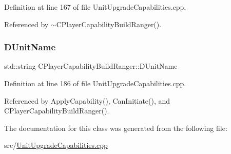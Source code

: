 Definition at line 167 of file Unit\+Upgrade\+Capabilities.\+cpp.



Referenced by $\sim$\+C\+Player\+Capability\+Build\+Ranger().

\hypertarget{classCPlayerCapabilityBuildRanger_a4e85674699365fe1e77bcb2a1996d7ba}{}\label{classCPlayerCapabilityBuildRanger_a4e85674699365fe1e77bcb2a1996d7ba} 
\subsubsection{\texorpdfstring{D\+Unit\+Name}{DUnitName}}
{\footnotesize\ttfamily std\+::string C\+Player\+Capability\+Build\+Ranger\+::\+D\+Unit\+Name\hspace{0.3cm}{\ttfamily [protected]}}



Definition at line 186 of file Unit\+Upgrade\+Capabilities.\+cpp.



Referenced by Apply\+Capability(), Can\+Initiate(), and C\+Player\+Capability\+Build\+Ranger().



The documentation for this class was generated from the following file\+:\begin{DoxyCompactItemize}
\item 
src/\hyperlink{UnitUpgradeCapabilities_8cpp}{Unit\+Upgrade\+Capabilities.\+cpp}\end{DoxyCompactItemize}
